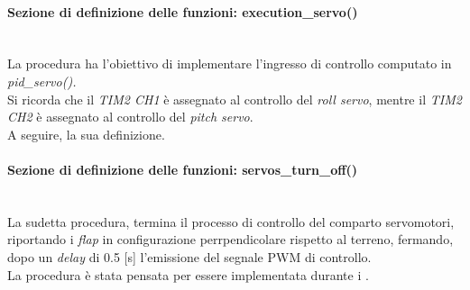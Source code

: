 \paragraph{Sezione di definizione delle funzioni: execution\_servo()}\mbox{}\\
La procedura ha l'obiettivo di implementare l'ingresso di controllo computato in \textit{pid\_servo().}\\
Si ricorda che il \textit{TIM2 CH1} è assegnato al controllo del \textit{roll servo}, mentre il \textit{TIM2 CH2} è assegnato al controllo del \textit{pitch servo}.\\
A seguire, la sua definizione.


\paragraph{Sezione di definizione delle funzioni: servos\_turn\_off()}\mbox{}\\
La sudetta procedura, termina il processo di controllo del comparto servomotori, riportando i \textit{flap} in configurazione perrpendicolare rispetto al terreno, fermando, dopo un \textit{delay} di 0.5 [s] l'emissione del segnale PWM di controllo.\\
La procedura è stata pensata per essere implementata durante i .



